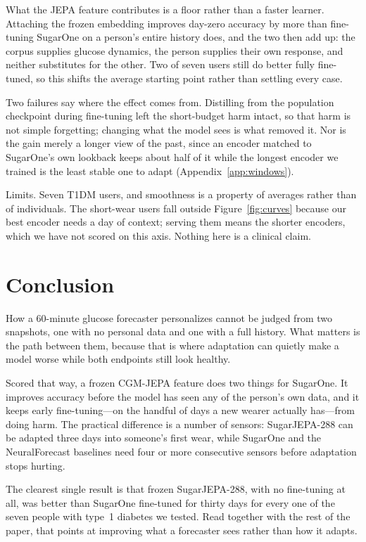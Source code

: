 \documentclass[11pt,a4paper]{article}
\begin{document}
What the JEPA feature contributes is a floor rather than a faster learner.
Attaching the frozen embedding improves day-zero accuracy by more than
fine-tuning SugarOne on a person's entire history does, and the two then add
up: the corpus supplies glucose dynamics, the person supplies their own
response, and neither substitutes for the other. Two of seven users still
do better fully fine-tuned, so this shifts the average starting point rather
than settling every case.

Two failures say where the effect comes from. Distilling from the population
checkpoint during fine-tuning left the short-budget harm intact, so that
harm is not simple forgetting; changing what the model sees is what removed
it. Nor is the gain merely a longer view of the past, since an encoder
matched to SugarOne's own lookback keeps about half of it while the longest
encoder we trained is the least stable one to adapt
(Appendix~\ref{app:windows}).

Limits. Seven T1DM users, and smoothness is a property of averages rather
than of individuals. The short-wear users fall outside
Figure~\ref{fig:curves} because our best encoder needs a day of context;
serving them means the shorter encoders, which we have not scored on this
axis. Nothing here is a clinical claim.

\section{Conclusion}
\label{sec:conclusion}

How a 60-minute glucose forecaster personalizes cannot be judged from two
snapshots, one with no personal data and one with a full history. What
matters is the path between them, because that is where adaptation can
quietly make a model worse while both endpoints still look healthy.

Scored that way, a frozen CGM-JEPA feature does two things for SugarOne. It
improves accuracy before the model has seen any of the person's own data,
and it keeps early fine-tuning---on the handful of days a new wearer
actually has---from doing harm. The practical difference is a number of
sensors: SugarJEPA-288 can be adapted three days into someone's first wear,
while SugarOne and the NeuralForecast baselines need four or more consecutive
sensors before adaptation stops hurting.

The clearest single result is that frozen SugarJEPA-288, with no fine-tuning
at all, was better than SugarOne fine-tuned for thirty days for every one of
the seven people with type~1 diabetes we tested. Read together with the rest
of the paper, that points at improving what a forecaster sees rather than
how it adapts.
\end{document}

